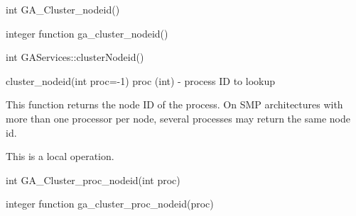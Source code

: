 \documentclass[12pt]{article}
\begin{document}

\begin{capi}
\begin{ccode}
int GA_Cluster_nodeid()
\end{ccode}
\end{capi}

\begin{fapi}
\begin{fcode}
integer function ga_cluster_nodeid()
\end{fcode}
\end{fapi}

\begin{cxxapi}
\begin{cxxcode}
int GAServices::clusterNodeid()
\end{cxxcode}
\end{cxxapi}

\begin{pyapi}
\begin{pycode}
cluster_nodeid(int proc=-1)
   proc (int)    - process ID to lookup
\end{pycode}
\end{pyapi}
\local

\begin{desc}

This function returns the node ID of the process. On SMP architectures with more
than one processor per node, several processes may return the same node id.

This is a  local operation.
\end{desc}


\begin{capi}
\begin{ccode}
int GA_Cluster_proc_nodeid(int proc)
\end{ccode}
\begin{funcargs}
\end{funcargs}
\end{capi}

\begin{fapi}
\begin{fcode}
integer function ga_cluster_proc_nodeid(proc)
\end{fcode}
\begin{funcargs}
\end{funcargs}
\end{fapi}
\end{document}
